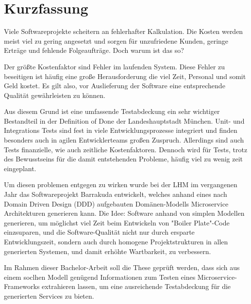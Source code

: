 \documentclass[12pt,a4paper,bibliography=totocnumbered,listof=totocnumbered]{scrartcl}
\begin{document}
\setcounter{page}{1}
\onehalfspacing
{}
\section{Kurzfassung}

Viele Softwareprojekte scheitern an fehlerhafter Kalkulation. Die Kosten werden meist viel zu gering angesetzt und sorgen für unzufriedene Kunden, geringe Erträge und fehlende Folgeaufträge. Doch warum ist das so?

Der größte Kostenfaktor sind Fehler im laufenden System. Diese Fehler zu beseitigen ist häufig eine große Herausforderung die viel Zeit, Personal und somit Geld kostet. Es gilt also, vor Auslieferung der Software eine entsprechende Qualität gewährleisten zu können.

Aus diesem Grund ist eine umfassende Testabdeckung ein sehr wichtiger Bestandteil in der Definition of Done der Landeshauptstadt München. Unit- und Integrations Tests sind fest in viele Entwicklungsprozesse integriert und finden besonders auch in agilen Entwicklerteams großen Zuspruch. Allerdings sind auch Tests finanzielle, wie auch zeitliche Kostenfaktoren.
Dennoch wird für Tests, trotz des Bewusstseins für die damit entstehenden Probleme, häufig viel zu wenig zeit eingeplant.

Um diesen problemen entgegen zu wirken wurde bei der LHM im vergangenen Jahr das Softwareprojekt Barrakuda entwickelt, welches anhand eines nach Domain Driven Design (DDD) aufgebauten Domänen-Modells Microservice Architekturen generieren kann. Die Idee: Software anhand von simplen Modellen generieren, um möglichst viel Zeit beim Entwickeln von "Boiler Plate"-Code einzsuparen, und die Software-Qualität nicht nur durch ersparte Entwicklungszeit, sondern auch durch homogene Projektstrukturen in allen generierten Systemen, und damit erhöhte Wartbarkeit, zu verbessern.

Im Rahmen dieser Bachelor-Arbeit soll die These geprüft werden, dass sich aus einem soclhen Modell genügend Informationen zum Testen eines Microservice-Frameworks extrahieren lassen, um eine ausreichende Testabdeckung für die generierten Services zu bieten.
\end{document}
